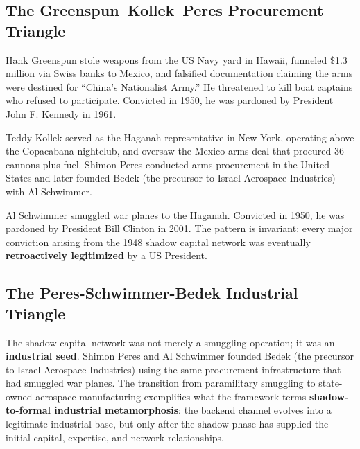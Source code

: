 \subsection{The Greenspun--Kollek--Peres Procurement Triangle}

Hank Greenspun stole weapons from the US Navy yard in Hawaii, funneled \$1.3 million via Swiss banks to Mexico, and falsified documentation claiming the arms were destined for ``China's Nationalist Army.'' He threatened to kill boat captains who refused to participate. Convicted in 1950, he was pardoned by President John F. Kennedy in 1961.

Teddy Kollek served as the Haganah representative in New York, operating above the Copacabana nightclub, and oversaw the Mexico arms deal that procured 36 cannons plus fuel. Shimon Peres conducted arms procurement in the United States and later founded Bedek (the precursor to Israel Aerospace Industries) with Al Schwimmer.

Al Schwimmer smuggled war planes to the Haganah. Convicted in 1950, he was pardoned by President Bill Clinton in 2001. The pattern is invariant: every major conviction arising from the 1948 shadow capital network was eventually \textbf{retroactively legitimized} by a US President.

\subsection{The Peres-Schwimmer-Bedek Industrial Triangle}

The shadow capital network was not merely a smuggling operation; it was an \textbf{industrial seed}. Shimon Peres and Al Schwimmer founded Bedek (the precursor to Israel Aerospace Industries) using the same procurement infrastructure that had smuggled war planes. The transition from paramilitary smuggling to state-owned aerospace manufacturing exemplifies what the framework terms \textbf{shadow-to-formal industrial metamorphosis}: the backend channel evolves into a legitimate industrial base, but only after the shadow phase has supplied the initial capital, expertise, and network relationships.

